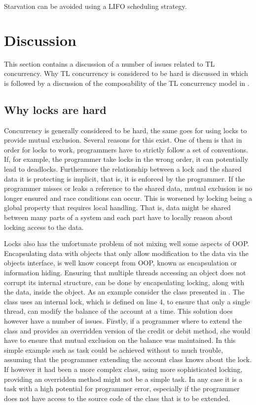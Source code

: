 Starvation can be avoided using a \ac{LIFO} scheduling strategy\cite[p. 459]{tanenbaum2008modern}.

\section{Discussion}
This section contains a discussion of a number of issues related to \ac{TL} concurrency. Why \ac{TL} concurrency is considered to be hard is discussed in  which is followed by a discussion of the composability of the \ac{TL} concurrency model in .
\subsection{Why locks are hard}\label{subsec:tl_lock_hard}
Concurrency is generally considered to be hard, the same goes for using locks to provide mutual exclusion\cite[p. 56]{sutter2005software}. Several reasons for this exist. One of them is that in order for locks to work, programmers have to strictly follow a set of conventions. If, for example, the programmer take locks in the wrong order, it can potentially lead to deadlocks\cite[p. 58]{sutter2005software}. Furthermore the relationship between a lock and the shared data it is protecting is implicit, that is, it is enforced by the programmer. If the programmer misses or leaks a reference to the shared data, mutual exclusion is no longer ensured and race conditions can occur. This is worsened by locking being a global property that requires local handling. That is, data might be shared between many parts of a system and each part have to locally reason about locking access to the data.

Locks also has the unfortunate problem of not mixing well some aspects of \ac{OOP}. Encapsulating data with objects that only allow modification to the data via the objects interface, is well know concept from \ac{OOP}, known as encapsulation or information hiding. Ensuring that multiple threads accessing an object does not corrupt its internal structure, can be done by encapsulating locking, along with the data, inside the object. As an example consider the  class presented in . The  class uses an internal lock, which is defined on line 4, to ensure that only a single thread, can modify the balance of the account at a time. This solution does however have a number of issues. Firstly, if a programmer where to extend the  class and provides an overridden version of the credit or debit method, she would have to ensure that mutual exclusion on the balance was maintained. In this simple example such as task could be achieved without to much trouble, assuming that the programmer extending the account class knows about the lock. If however it had been a more complex class, using more sophisticated locking, providing an overridden method might not be a simple task. In any case it is a task with a high potential for programmer error, especially if the programmer does not have access to the source code of the class that is to be extended.

